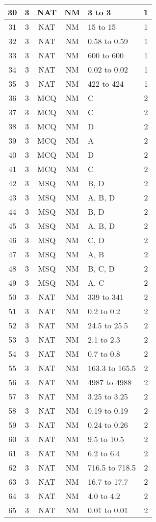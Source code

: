 \begin{table}
\begin{center}
\begin{tabular}[12pt]{|c|c|c|c|l|c|}
\hline
30 & 3 & NAT & NM & 3 to 3 & 1 \\
\hline
31 & 3 & NAT & NM & 15 to 15 & 1 \\
\hline
32 & 3 & NAT & NM & 0.58 to 0.59 & 1 \\
\hline
33 & 3 & NAT & NM & 600 to 600 & 1 \\
\hline
34 & 3 & NAT & NM & 0.02 to 0.02 & 1 \\
\hline
35 & 3 & NAT & NM & 422 to 424 & 1 \\
\hline
36 & 3 & MCQ & NM & C & 2 \\
\hline
37 & 3 & MCQ & NM & C & 2 \\
\hline
38 & 3 & MCQ & NM & D & 2 \\
\hline
39 & 3 & MCQ & NM & A & 2 \\
\hline
40 & 3 & MCQ & NM & D & 2 \\
\hline
41 & 3 & MCQ & NM & C & 2 \\
\hline
42 & 3 & MSQ & NM & B, D & 2 \\
\hline
43 & 3 & MSQ & NM & A, B, D & 2 \\
\hline
44 & 3 & MSQ & NM & B, D & 2 \\
\hline
45 & 3 & MSQ & NM & A, B, D & 2 \\
\hline
46 & 3 & MSQ & NM & C, D & 2 \\
\hline
47 & 3 & MSQ & NM & A, B & 2 \\
\hline
48 & 3 & MSQ & NM & B, C, D & 2 \\
\hline
49 & 3 & MSQ & NM & A, C & 2 \\
\hline
50 & 3 & NAT & NM & 339 to 341 & 2 \\
\hline
51 & 3 & NAT & NM & 0.2 to 0.2 & 2 \\
\hline
52 & 3 & NAT & NM & 24.5 to 25.5 & 2 \\
\hline
53 & 3 & NAT & NM & 2.1 to 2.3 & 2 \\
\hline
54 & 3 & NAT & NM & 0.7 to 0.8 & 2 \\
\hline
55 & 3 & NAT & NM & 163.3 to 165.5 & 2 \\
\hline
56 & 3 & NAT & NM & 4987 to 4988 & 2 \\
\hline
57 & 3 & NAT & NM & 3.25 to 3.25 & 2 \\
\hline
58 & 3 & NAT & NM & 0.19 to 0.19 & 2 \\
\hline
59 & 3 & NAT & NM & 0.24 to 0.26 & 2 \\
\hline
60 & 3 & NAT & NM & 9.5 to 10.5 & 2 \\
\hline
61 & 3 & NAT & NM & 6.2 to 6.4 & 2 \\
\hline
62 & 3 & NAT & NM & 716.5 to 718.5 & 2 \\
\hline
63 & 3 & NAT & NM & 16.7 to 17.7 & 2 \\
\hline
64 & 3 & NAT & NM & 4.0 to 4.2 & 2 \\
\hline
65 & 3 & NAT & NM & 0.01 to 0.01 & 2 \\
\hline
\end{tabular}
\end{center}
\end{table}
